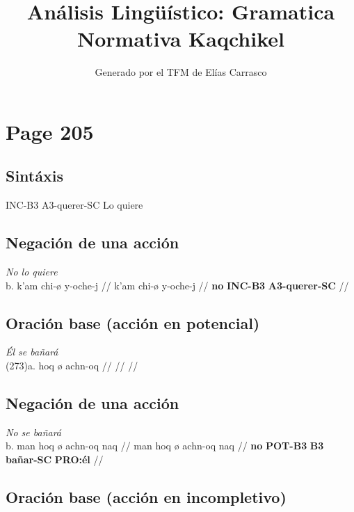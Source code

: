 \documentclass{article}%
\title{Análisis Lingüístico: Gramatica Normativa Kaqchikel}%
\author{Generado por el TFM de Elías Carrasco}%
\begin{document}
%
\normalsize%
\maketitle%
\section{Page 205}%
\label{sec:Page205}%
\subsection{Sintáxis}%
\label{subsec:Sintxis}%

%
INC{-}B3 %
A3{-}querer{-}SC %
Lo quiere %
\subsection{Negación de una acción}%
\label{subsec:Negacindeunaaccin}%

%
\par\medskip%
\ex
\textit{No lo quiere} \\
\begingl
\gla b. k'am chi-ø y-oche-j //
\glb k'am chi-ø y-oche-j //
\glc \textbf{no} \textbf{INC-}\textbf{B3} \textbf{A3-}\textbf{querer-}\textbf{SC} //
\endgl
\xe
%
\medskip%
\subsection{Oración base (acción en potencial)}%
\label{subsec:Oracinbase(accinenpotencial)}%

%
\par\medskip%
\ex
\textit{Él se bañará} \\
\begingl
\gla (273)a. hoq ø achn-oq //
\glb  //
\glc  //
\endgl
\xe
%
\medskip%
\subsection{Negación de una acción}%
\label{subsec:Negacindeunaaccin}%

%
\par\medskip%
\ex
\textit{No se bañará} \\
\begingl
\gla b. man hoq ø achn-oq naq //
\glb man hoq ø achn-oq naq //
\glc \textbf{no} \textbf{POT-B3} \textbf{B3} \textbf{bañar-}\textbf{SC} \textbf{PRO:él} //
\endgl
\xe
%
\medskip%
\subsection{Oración base (acción en incompletivo)}%
\label{subsec:Oracinbase(accinenincompletivo)}%
\end{document}
